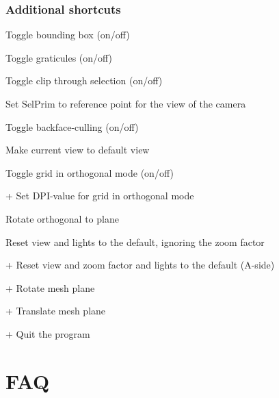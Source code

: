 \subsection*{Additional shortcuts}     
    Toggle bounding box (on/off)
   
    Toggle graticules (on/off)
   
     Toggle clip through selection (on/off)
   
    Set SelPrim to reference point for the view of the camera
   
    Toggle backface-culling (on/off)
   
    Make current view to default view
   
    Toggle grid in orthogonal mode  (on/off)

    +  Set DPI-value for grid in orthogonal mode
  
    Rotate orthogonal to plane   
   
    Reset view and lights to the default, ignoring the zoom factor
   
    +  Reset view and zoom factor and lights to the default (A-side)
      
    + \quad Rotate mesh plane
         
    + \quad Translate mesh plane
   
   \Ctrl +  Quit the program

\chapter{FAQ}
\label{FAQ}

